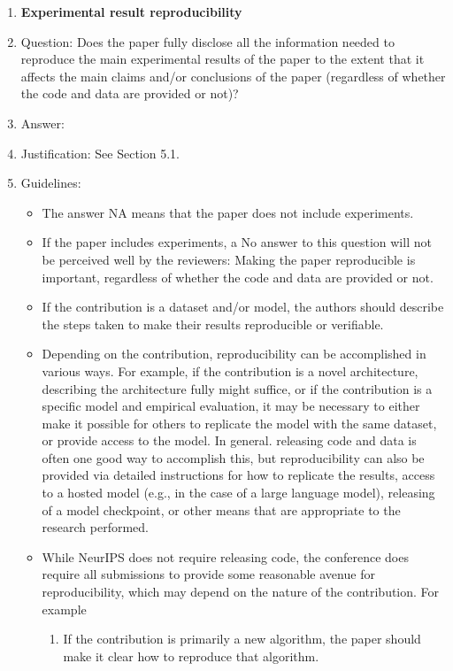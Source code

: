 \documentclass{article}
\theoremstyle{plain}
\theoremstyle{definition}
\theoremstyle{remark}
\begin{document}
\begin{enumerate}
    \item {\bf Experimental result reproducibility}
    \item[] Question: Does the paper fully disclose all the information needed to reproduce the main experimental results of the paper to the extent that it affects the main claims and/or conclusions of the paper (regardless of whether the code and data are provided or not)?
    \item[] Answer: \answerYes{} %
    \item[] Justification: See Section 5.1.
    \item[] Guidelines:
    \begin{itemize}
        \item The answer NA means that the paper does not include experiments.
        \item If the paper includes experiments, a No answer to this question will not be perceived well by the reviewers: Making the paper reproducible is important, regardless of whether the code and data are provided or not.
        \item If the contribution is a dataset and/or model, the authors should describe the steps taken to make their results reproducible or verifiable. 
        \item Depending on the contribution, reproducibility can be accomplished in various ways. For example, if the contribution is a novel architecture, describing the architecture fully might suffice, or if the contribution is a specific model and empirical evaluation, it may be necessary to either make it possible for others to replicate the model with the same dataset, or provide access to the model. In general. releasing code and data is often one good way to accomplish this, but reproducibility can also be provided via detailed instructions for how to replicate the results, access to a hosted model (e.g., in the case of a large language model), releasing of a model checkpoint, or other means that are appropriate to the research performed.
        \item While NeurIPS does not require releasing code, the conference does require all submissions to provide some reasonable avenue for reproducibility, which may depend on the nature of the contribution. For example
        \begin{enumerate}
            \item If the contribution is primarily a new algorithm, the paper should make it clear how to reproduce that algorithm.

\end{enumerate}
\end{itemize}
\end{enumerate}
\end{document}
